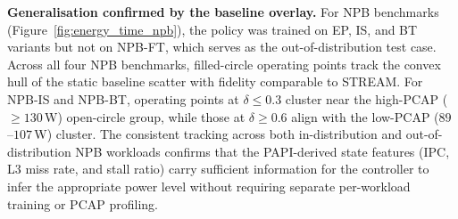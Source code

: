 \noindent\textbf{Generalisation confirmed by the baseline overlay.}
For NPB benchmarks (Figure~\ref{fig:energy_time_npb}), the policy was trained on EP, IS, and BT variants but not on NPB-FT, which serves as the out-of-distribution test case. Across all four NPB benchmarks, filled-circle operating points track the convex hull of the static baseline scatter with fidelity comparable to STREAM. For NPB-IS and NPB-BT, operating points at $\delta \leq 0.3$ cluster near the high-PCAP ($\geq 130$\,W) open-circle group, while those at $\delta \geq 0.6$ align with the low-PCAP ($89$--$107$\,W) cluster. The consistent tracking across both in-distribution and out-of-distribution NPB workloads confirms that the PAPI-derived state features (IPC, L3 miss rate, and stall ratio) carry sufficient information for the controller to infer the appropriate power level without requiring separate per-workload training or PCAP profiling.
